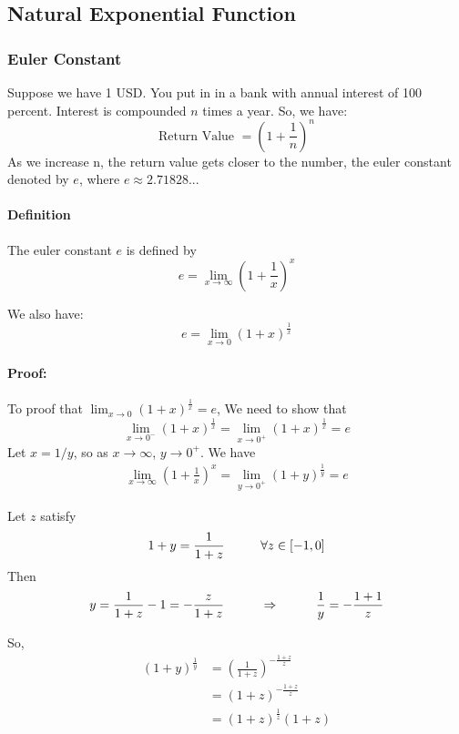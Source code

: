 \documentclass[12pt]{article}
\newcommand\tab[1][1cm]{\hspace*{#1}}
\begin{document}
\subsection{Natural Exponential Function}
\subsubsection{Euler Constant}
Suppose we have 1 USD. You put in in a bank with annual interest of 100 percent. Interest is compounded $n$ times a year. 
So, we have:
\[
    \textrm{Return Value } = \left(1 + \frac{1}{n} \right)^n
\]
As we increase n, the return value gets closer to the number, the euler constant denoted by $e$, where
$e \approx 2.71828...$

\paragraph{Definition}
The euler constant $e$ is defined by 
\[
    e = \lim_{x \to \infty} \left( 1 + \frac{1}{x} \right)^x
\]

\noindent
We also have:
\[
    e = \lim_{x \to 0} (1 + x)^{\frac{1}{x}}
\]

\paragraph{Proof:} To proof that $\lim_{x \to 0} (1 + x)^{\frac{1}{x}} = e$, We need to show that 
\[ 
    \lim_{x \to 0^{-}} (1 + x)^{\frac{1}{x}} = \lim_{x \to 0^{+}} (1 + x)^{\frac{1}{x}} = e
\]
\noindent
Let $x = 1/y$, so as $x \to \infty$, $y \to 0^{+}$. We have
\begin{align*} 
    \lim_{x \to \infty} \left( 1 + \frac{1}{x} \right)^x = \lim_{y \to 0^{+}} \left( 1 + y \right)^{\frac{1}{y}} = e
\end{align*}

\noindent
Let $z$ satisfy
\[
    1 + y = \frac{1}{1 + z} \textrm{\tab} \forall z \in [ - 1, 0]
\]
Then
\begin{align*} 
    y = \frac{1}{1 + z} - 1 = - \frac{z}{1 + z} \textrm{\tab} \Rightarrow \textrm{\tab} \frac{1}{y} = - \frac{1 + 1}{z} \\
\end{align*}

\noindent
So,
\begin{align*} 
    (1 + y)^{\frac{1}{y}} &= \left(\frac{1}{1 + z} \right)^{ -\frac{1 + z}{z}} \\
    &= (1 + z)^{ -\frac{1 + z}{z}} \\
    &= (1 + z)^{\frac{1}{z}}(1 + z)
\end{align*}
\end{document}
